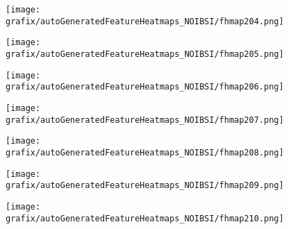 \begin{subfigure}{\wid\textwidth} 
    \centering 
    \caption{\tiny \sffamily {}} 
    \vspace{\vsp} 
    \texttt{[image: grafix/autoGeneratedFeatureHeatmaps\_NOIBSI/fhmap204.png]} 
\end{subfigure} 
\hspace{\hsp} 
\begin{subfigure}{\wid\textwidth} 
    \centering 
    \caption{\tiny \sffamily {}} 
    \vspace{\vsp} 
    \texttt{[image: grafix/autoGeneratedFeatureHeatmaps\_NOIBSI/fhmap205.png]} 
\end{subfigure} 
\hspace{\hsp} 
\begin{subfigure}{\wid\textwidth} 
    \centering 
    \caption{\tiny \sffamily {}} 
    \vspace{\vsp} 
    \texttt{[image: grafix/autoGeneratedFeatureHeatmaps\_NOIBSI/fhmap206.png]} 
\end{subfigure} 
\hspace{\hsp} 
\begin{subfigure}{\wid\textwidth} 
    \centering 
    \caption{\tiny \sffamily {}} 
    \vspace{\vsp} 
    \texttt{[image: grafix/autoGeneratedFeatureHeatmaps\_NOIBSI/fhmap207.png]} 
\end{subfigure} 
\hspace{\hsp} 
\begin{subfigure}{\wid\textwidth} 
    \centering 
    \caption{\tiny \sffamily {}} 
    \vspace{\vsp} 
    \texttt{[image: grafix/autoGeneratedFeatureHeatmaps\_NOIBSI/fhmap208.png]} 
\end{subfigure} 
\hspace{\hsp} 
\begin{subfigure}{\wid\textwidth} 
    \centering 
    \caption{\tiny \sffamily {}} 
    \vspace{\vsp} 
    \texttt{[image: grafix/autoGeneratedFeatureHeatmaps\_NOIBSI/fhmap209.png]} 
\end{subfigure} 
\hspace{\hsp} 
\begin{subfigure}{\wid\textwidth} 
    \centering 
    \caption{\tiny \sffamily {}} 
    \vspace{\vsp} 
    \texttt{[image: grafix/autoGeneratedFeatureHeatmaps\_NOIBSI/fhmap210.png]} 
\end{subfigure} 
